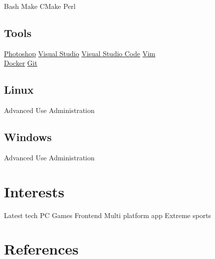 \documentclass[a4paper,final]{deedy-resume}%
\newcommand{\mySep}{{\color{black!40!white}\textbullet{}}}
\newcommand{\mySmallSpace}{\vspace{3pt}}
\begin{document}
\begin{minipage}[t]{0.33\textwidth}
	{\small
		Bash \mySep{}
		Make \mySep{}
		CMake \mySep{}
		Perl
		\mySmallSpace{}
	}

	\sectionspace %

	\subsection{Tools}
	{\small
		\href{http://www.adobe.com/products/photoshop.html}{Photoshop} \mySep{}
		\href{https://www.visualstudio.com/}{Visual Studio} \mySep{}
		\href{https://code.visualstudio.com/}{Visual Studio Code} \mySep{}
		\href{http://www.vim.org/}{Vim} \\
		\href{https://www.docker.com/}{Docker} \mySep{}
		\href{https://git-scm.com/}{Git}
	}

	\sectionspace %

	\subsection{Linux}
	Advanced Use \mySep{}
	Administration

	\subsection{Windows}
	Advanced Use \mySep{}
	Administration

	\section{Interests}
	 {Latest tech} \mySep{}
	{PC Games} \mySep{}
	{Frontend} \mySep{}
	{Multi platform app} \mySep{}
	{Extreme sports}
	\section{References}

	\href{https://github.com/rajzik}{}

	\sectionspace %



\end{minipage} %
\end{document}
